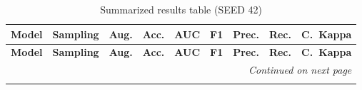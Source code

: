 \documentclass[a4paper,10pt]{book}
\begin{document}
\begin{scriptsize}
\begin{longtable}{@{}l l p{0.5cm} p{1.2cm} p{1.2cm} p{1.2cm} p{1.2cm} p{1.2cm} p{1.2cm}@{}}
\caption{Summarized results table (SEED 42)}
\label{tab:avg_metrics_seed_42} \\
\toprule
\textbf{Model} & \textbf{Sampling} & \textbf{Aug.} &
\textbf{Acc.} & \textbf{AUC} & \textbf{F1} &
\textbf{Prec.} & \textbf{Rec.} & \textbf{C.\ Kappa}\\
\midrule
\endfirsthead

\toprule
\textbf{Model} & \textbf{Sampling} & \textbf{Aug.} &
\textbf{Acc.} & \textbf{AUC} & \textbf{F1} &
\textbf{Prec.} & \textbf{Rec.} & \textbf{C.\ Kappa}\\
\midrule
\endhead

\midrule
\multicolumn{9}{r}{\textit{Continued on next page}}\\
\midrule
\endfoot


\end{longtable}
\end{scriptsize}
\end{document}
